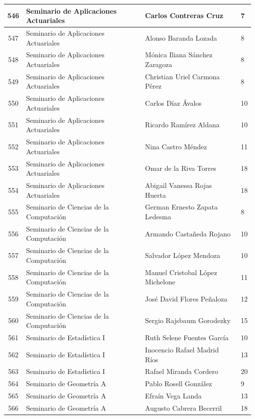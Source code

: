 {\begin{longtable}{|c|p{6.5cm}|p{5cm}|p{1.5cm}|}
  546 & Seminario de Aplicaciones Actuariales & Carlos Contreras Cruz & 7 \\ \hline 
  547 & Seminario de Aplicaciones Actuariales & Alonso Baranda Lozada & 8 \\ \hline 
  548 & Seminario de Aplicaciones Actuariales & Mónica Iliana Sánchez Zaragoza & 8 \\ \hline 
  549 & Seminario de Aplicaciones Actuariales & Christian Uriel Carmona Pérez & 8 \\ \hline 
  550 & Seminario de Aplicaciones Actuariales & Carlos Díaz Ávalos & 10 \\ \hline 
  551 & Seminario de Aplicaciones Actuariales & Ricardo Ramírez Aldana & 10 \\ \hline 
  552 & Seminario de Aplicaciones Actuariales & Nina Castro Méndez & 11 \\ \hline 
  553 & Seminario de Aplicaciones Actuariales & Omar de la Riva Torres & 18 \\ \hline 
  554 & Seminario de Aplicaciones Actuariales & Abigail Vanessa Rojas Huerta & 18 \\ \hline 
  555 & Seminario de Ciencias de la Computación & German Ernesto Zapata Ledesma & 8 \\ \hline 
  556 & Seminario de Ciencias de la Computación & Armando Castañeda Rojano & 10 \\ \hline 
  557 & Seminario de Ciencias de la Computación & Salvador López Mendoza & 10 \\ \hline 
  558 & Seminario de Ciencias de la Computación & Manuel Cristobal López Michelone & 11 \\ \hline 
  559 & Seminario de Ciencias de la Computación & José David Flores Peñaloza & 12 \\ \hline 
  560 & Seminario de Ciencias de la Computación & Sergio Rajsbaum Gorodezky & 15 \\ \hline 
  561 & Seminario de Estadística I & Ruth Selene Fuentes García & 10 \\ \hline 
  562 & Seminario de Estadística I & Inocencio Rafael Madrid Ríos & 13 \\ \hline 
  563 & Seminario de Estadística I & Rafael Miranda Cordero & 20 \\ \hline 
  564 & Seminario de Geometría A & Pablo Rosell González & 9 \\ \hline 
  565 & Seminario de Geometría A & Efraín Vega Landa & 13 \\ \hline 
  566 & Seminario de Geometría A & Augusto Cabrera Becerril & 18 \\ \hline 

\end{longtable}}
